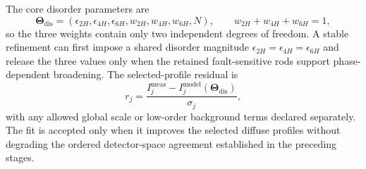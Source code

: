 The core disorder parameters are
\begin{equation}
  \boldsymbol{\Theta}_{\mathrm{dis}}=
  (\epsilon_{2H},\epsilon_{4H},\epsilon_{6H},
  w_{2H},w_{4H},w_{6H},N),
  \qquad w_{2H}+w_{4H}+w_{6H}=1,
  \label{eq:pbi2_disorder_parameter_vector}
\end{equation}
so the three weights contain only two independent degrees of freedom.  A
stable refinement can first impose a shared disorder magnitude
$\epsilon_{2H}=\epsilon_{4H}=\epsilon_{6H}$ and release the three values only
when the retained fault-sensitive rods support phase-dependent broadening.
The selected-profile residual is
\begin{equation}
  r_j=\frac{I_j^{\mathrm{meas}}-
  I_j^{\mathrm{model}}(\boldsymbol{\Theta}_{\mathrm{dis}})}{\sigma_j},
  \label{eq:pbi2_disorder_profile_residual}
\end{equation}
with any allowed global scale or low-order background terms declared
separately.  The fit is accepted only when it improves the selected diffuse
profiles without degrading the ordered detector-space agreement established
in the preceding stages.

